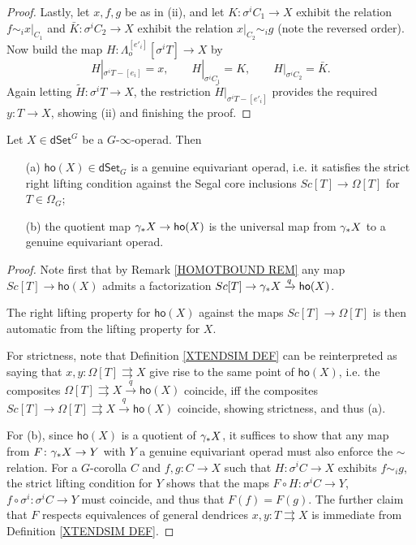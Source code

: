 \documentclass[a4paper,10pt
,draft
]{article}%
\renewcommand{\1}{\eta}%
\begin{document}
\begin{proof}
Lastly, let $x,f,g$ be as in (ii), 
and let
$K \colon \sigma^i C_1 \to X$ exhibit the relation
$f \sim_i x|_{C_1}$
and 
$ \bar{K} \colon \sigma^i C_2 \to X$
exhibit the relation
$x|_{C_2} \sim_i g$ (note the reversed order).
Now build the map
$H \colon \Lambda_o^{[e'_i]}[\sigma^i T] \to X$ by
\[
	H|_{\sigma^i T - [e_i]} = x,
\qquad
	H|_{\sigma^i C_1} = K,
\qquad
	H|_{\sigma^i C_2} = \bar{K}.
\]
Again letting 
$\widetilde{H} \colon \sigma^i T \to X$,
the restriction 
$\widetilde{H}|_{\sigma^i T - [e'_i]}$
provides the required $y \colon T \to X$,
showing (ii) and finishing the proof.
\end{proof}


\begin{corollary}
Let $X \in \mathsf{dSet}^G$ be a $G$-$\infty$-operad. Then
	\begin{itemize}
	\item[(a)] $\mathsf{ho}(X)\in \mathsf{dSet}_G$ is a genuine equivariant operad, i.e. it satisfies the strict right lifting condition against the Segal core inclusions
	$Sc[T] \to \Omega[T]$ for $T \in \Omega_G$;
	\item[(b)] the quotient map
	$\gamma_{\**}X \to \mathsf{ho}(X)$ is the universal map from $\gamma_{\**}X$ to a genuine equivariant operad.
	\end{itemize}
\end{corollary}

\begin{proof}
	Note first that by Remark \ref{HOMOTBOUND REM}
	any map 	$Sc[T] \to \mathsf{ho}(X)$ admits a factorization 
	$Sc[T] \to \gamma_{\**}X \xrightarrow{q} \mathsf{ho}(X)$.
	
	The right lifting property for $\mathsf{ho}(X)$
	against the maps $Sc[T] \to \Omega[T]$
	is then automatic from the lifting property for $X$.

	For strictness,	
	note that Definition \ref{XTENDSIM DEF}
	can be reinterpreted as saying that
	$x,y \colon \Omega[T] \rightrightarrows X$
	give rise to the same point of 
	$\mathsf{ho}(X)$, i.e. 
	the composites 
	$\Omega[T] \rightrightarrows X \xrightarrow{q}
	\mathsf{ho}(X)$ coincide, 
	iff the composites 
	$Sc[T] \to \Omega[T] \rightrightarrows X \xrightarrow{q}
	\mathsf{ho}(X)$ coincide, showing strictness, and thus (a).
		
	For (b), since $\mathsf{ho}(X)$ is a quotient of
	$\gamma_{\**} X$, it suffices to show that any map
	from $F \colon \gamma_{\**}X \to Y$ with $Y$ a genuine equivariant operad must also enforce the $\sim$ relation.
	For a $G$-corolla $C$ and
	$f,g\colon C \to X$ such that 
	$H \colon \sigma^i C \to X$ exhibits
	$f \sim_i g$, 
	the strict lifting condition for $Y$
	shows that the maps
	$F\circ H \colon \sigma^i C \to Y$,
	$f \circ \sigma^i \colon \sigma^i C \to Y$
	must coincide, and thus that
	$F(f)=F(g)$.
	The further claim that $F$ respects equivalences
	of general dendrices $x,y\colon T \rightrightarrows X$
	is immediate from Definition \ref{XTENDSIM DEF}.
\end{proof}
\end{document}
